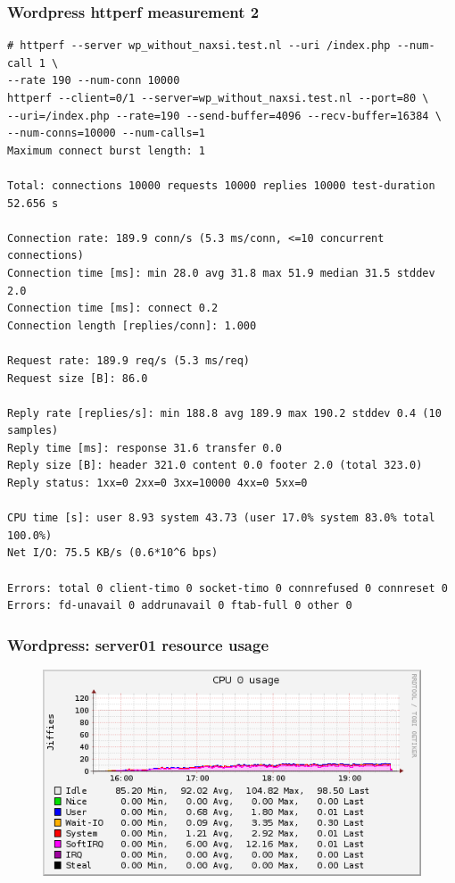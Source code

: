 \documentclass[Measurement results]{subfiles}
\begin{document}
\subsubsection{Wordpress httperf measurement 2}
\label{sec:baseline_measurement_2}
\begin{verbatim}
# httperf --server wp_without_naxsi.test.nl --uri /index.php --num-call 1 \
--rate 190 --num-conn 10000
httperf --client=0/1 --server=wp_without_naxsi.test.nl --port=80 \
--uri=/index.php --rate=190 --send-buffer=4096 --recv-buffer=16384 \ 
--num-conns=10000 --num-calls=1
Maximum connect burst length: 1

Total: connections 10000 requests 10000 replies 10000 test-duration 52.656 s

Connection rate: 189.9 conn/s (5.3 ms/conn, <=10 concurrent connections)
Connection time [ms]: min 28.0 avg 31.8 max 51.9 median 31.5 stddev 2.0
Connection time [ms]: connect 0.2
Connection length [replies/conn]: 1.000

Request rate: 189.9 req/s (5.3 ms/req)
Request size [B]: 86.0

Reply rate [replies/s]: min 188.8 avg 189.9 max 190.2 stddev 0.4 (10 samples)
Reply time [ms]: response 31.6 transfer 0.0
Reply size [B]: header 321.0 content 0.0 footer 2.0 (total 323.0)
Reply status: 1xx=0 2xx=0 3xx=10000 4xx=0 5xx=0

CPU time [s]: user 8.93 system 43.73 (user 17.0% system 83.0% total 100.0%)
Net I/O: 75.5 KB/s (0.6*10^6 bps)

Errors: total 0 client-timo 0 socket-timo 0 connrefused 0 connreset 0
Errors: fd-unavail 0 addrunavail 0 ftab-full 0 other 0
\end{verbatim}

\newpage
\subsubsection{Wordpress: server01 resource usage}
\label{sec:Wordpress baseline server01 resource usage}
\begin{figure}[H]
\centering
\includegraphics[scale=0.7]{images/results/baseline_wp/cpu.png}
\end{figure}
\end{document}

